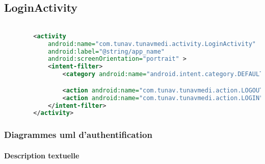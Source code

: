 \subsection{LoginActivity}


\begin{lstlisting}[language=xml, caption=Déclaration de LoginActivity dans AndroidManifest]

        <activity
            android:name="com.tunav.tunavmedi.activity.LoginActivity"
            android:label="@string/app_name"
            android:screenOrientation="portrait" >
            <intent-filter>
                <category android:name="android.intent.category.DEFAULT" />

                <action android:name="com.tunav.tunavmedi.action.LOGOUT" />
                <action android:name="com.tunav.tunavmedi.action.LOGIN" />
            </intent-filter>
        </activity>

\end{lstlisting}

\subsubsection[Diagrammes d'authentification]{Diagrammes \gls{uml} d'authentification}

\paragraph{Description textuelle}

